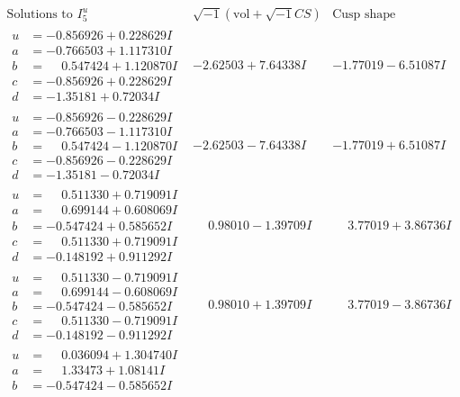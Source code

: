 \documentclass[1p]{elsarticle_modified}
\theoremstyle{definition}
\newcommand{\I}{\sqrt{-1}}
\begin{document}
$$\begin{array}{c|c|c}  
\text{Solutions to }I^u_{5}& \I (\text{vol} + \sqrt{-1}CS) & \text{Cusp shape}\\
 \hline 
\begin{aligned}
u &= -0.856926 + 0.228629 I \\
a &= -0.766503 + 1.117310 I \\
b &= \phantom{-}0.547424 + 1.120870 I \\
c &= -0.856926 + 0.228629 I \\
d &= -1.35181 + 0.72034 I\end{aligned}
 & -2.62503 + 7.64338 I & -1.77019 - 6.51087 I \\ \hline\begin{aligned}
u &= -0.856926 - 0.228629 I \\
a &= -0.766503 - 1.117310 I \\
b &= \phantom{-}0.547424 - 1.120870 I \\
c &= -0.856926 - 0.228629 I \\
d &= -1.35181 - 0.72034 I\end{aligned}
 & -2.62503 - 7.64338 I & -1.77019 + 6.51087 I \\ \hline\begin{aligned}
u &= \phantom{-}0.511330 + 0.719091 I \\
a &= \phantom{-}0.699144 + 0.608069 I \\
b &= -0.547424 + 0.585652 I \\
c &= \phantom{-}0.511330 + 0.719091 I \\
d &= -0.148192 + 0.911292 I\end{aligned}
 & \phantom{-}0.98010 - 1.39709 I & \phantom{-}3.77019 + 3.86736 I \\ \hline\begin{aligned}
u &= \phantom{-}0.511330 - 0.719091 I \\
a &= \phantom{-}0.699144 - 0.608069 I \\
b &= -0.547424 - 0.585652 I \\
c &= \phantom{-}0.511330 - 0.719091 I \\
d &= -0.148192 - 0.911292 I\end{aligned}
 & \phantom{-}0.98010 + 1.39709 I & \phantom{-}3.77019 - 3.86736 I \\ \hline\begin{aligned}
u &= \phantom{-}0.036094 + 1.304740 I \\
a &= \phantom{-}1.33473 + 1.08141 I \\
b &= -0.547424 - 0.585652 I \\

\end{aligned}
\end{array}$$
\end{document}
